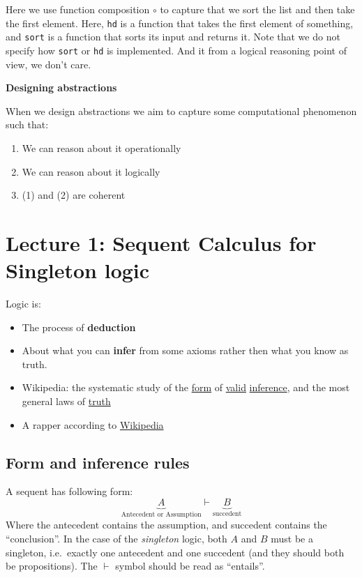 \documentclass{article}
\begin{document}
Here we use function composition \(\circ\) to capture that we sort the
list and then take the first element. Here, \texttt{hd} is a function
that takes the first element of something, and \texttt{sort} is a
function that sorts its input and returns it. Note that we do not
specify how \texttt{sort} or \texttt{hd} is implemented. And it from a
logical reasoning point of view, we don't care.

\textbf{Designing abstractions}

When we design abstractions we aim to capture some computational
phenomenon such that:

\begin{enumerate}
	\item
	We can reason about it operationally
	\item
	We can reason about it logically
	\item (1) and (2) are coherent
\end{enumerate}

\section{Lecture 1: Sequent Calculus for Singleton logic}

Logic is:

\begin{itemize}
	\item
	The process of \textbf{deduction}
	\item
	About what you can \textbf{infer} from some axioms rather then what you know as truth.
	\item
	Wikipedia: the systematic study of the
	\href{https://en.wikipedia.org/wiki/Logical_form}{form} of
	\href{https://en.wikipedia.org/wiki/Validity_(logic)}{valid}
	\href{https://en.wikipedia.org/wiki/Inference}{inference}, and the
	most general laws of \href{https://en.wikipedia.org/wiki/Truth}{truth}
	\item
	A rapper according to
	\href{https://en.wikipedia.org/wiki/Logic_(musician)}{Wikipedia}
\end{itemize}

\subsection{Form and inference rules}


A sequent has following form: \[
\underbrace{A}_{\text{Antecedent or Assumption}} \vdash \underbrace{B}_{\text{succedent}}
\] Where the antecedent contains the assumption, and succedent contains
the ``conclusion''. In the case of the \emph{singleton} logic, both
\(A\) and \(B\) must be a singleton, i.e.~exactly one antecedent and one succedent (and they should both be propositions). The \(\vdash\) symbol should be read as ``entails''.
\end{document}
